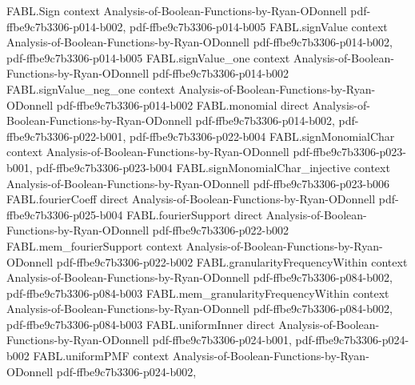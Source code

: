 \begin{theorem}
\label{FABL.noiseStability_toReal_eq_two_mul_agreement_sub_one}
\leanok
{}
\proofstep
  {FABL.Sign}
  {context}
  {Analysis-of-Boolean-Functions-by-Ryan-ODonnell}
  {pdf-ffbe9c7b3306-p014-b002,
    pdf-ffbe9c7b3306-p014-b005}
\proofstep
  {FABL.signValue}
  {context}
  {Analysis-of-Boolean-Functions-by-Ryan-ODonnell}
  {pdf-ffbe9c7b3306-p014-b002,
    pdf-ffbe9c7b3306-p014-b005}
\proofstep
  {FABL.signValue_one}
  {context}
  {Analysis-of-Boolean-Functions-by-Ryan-ODonnell}
  {pdf-ffbe9c7b3306-p014-b002}
\proofstep
  {FABL.signValue_neg_one}
  {context}
  {Analysis-of-Boolean-Functions-by-Ryan-ODonnell}
  {pdf-ffbe9c7b3306-p014-b002}
\proofstep
  {FABL.monomial}
  {direct}
  {Analysis-of-Boolean-Functions-by-Ryan-ODonnell}
  {pdf-ffbe9c7b3306-p014-b002,
    pdf-ffbe9c7b3306-p022-b001,
    pdf-ffbe9c7b3306-p022-b004}
\proofstep
  {FABL.signMonomialChar}
  {context}
  {Analysis-of-Boolean-Functions-by-Ryan-ODonnell}
  {pdf-ffbe9c7b3306-p023-b001,
    pdf-ffbe9c7b3306-p023-b004}
\proofstep
  {FABL.signMonomialChar_injective}
  {context}
  {Analysis-of-Boolean-Functions-by-Ryan-ODonnell}
  {pdf-ffbe9c7b3306-p023-b006}
\proofstep
  {FABL.fourierCoeff}
  {direct}
  {Analysis-of-Boolean-Functions-by-Ryan-ODonnell}
  {pdf-ffbe9c7b3306-p025-b004}
\proofstep
  {FABL.fourierSupport}
  {direct}
  {Analysis-of-Boolean-Functions-by-Ryan-ODonnell}
  {pdf-ffbe9c7b3306-p022-b002}
\proofstep
  {FABL.mem_fourierSupport}
  {context}
  {Analysis-of-Boolean-Functions-by-Ryan-ODonnell}
  {pdf-ffbe9c7b3306-p022-b002}
\proofstep
  {FABL.granularityFrequencyWithin}
  {context}
  {Analysis-of-Boolean-Functions-by-Ryan-ODonnell}
  {pdf-ffbe9c7b3306-p084-b002,
    pdf-ffbe9c7b3306-p084-b003}
\proofstep
  {FABL.mem_granularityFrequencyWithin}
  {context}
  {Analysis-of-Boolean-Functions-by-Ryan-ODonnell}
  {pdf-ffbe9c7b3306-p084-b002,
    pdf-ffbe9c7b3306-p084-b003}
\proofstep
  {FABL.uniformInner}
  {direct}
  {Analysis-of-Boolean-Functions-by-Ryan-ODonnell}
  {pdf-ffbe9c7b3306-p024-b001,
    pdf-ffbe9c7b3306-p024-b002}
\proofstep
  {FABL.uniformPMF}
  {context}
  {Analysis-of-Boolean-Functions-by-Ryan-ODonnell}
  {pdf-ffbe9c7b3306-p024-b002,
}
\end{theorem}
